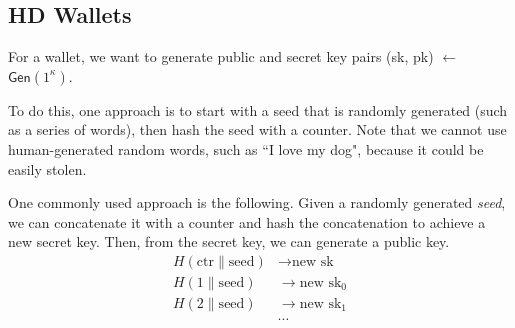 \subsection{HD Wallets}
For a wallet, we want to generate public and secret key pairs (sk, pk) $\longleftarrow$ $\mathsf{Gen}(1^\kappa)$.

To do this, one approach is to start with a seed that is randomly generated (such as a series of words), then hash the seed with a counter. Note that we cannot use human-generated random words, such as ``I love my dog", because it could be easily stolen.

One commonly used approach is the following. Given a randomly generated \textit{seed}, we can concatenate it with a counter and hash the concatenation to achieve a new secret key. Then, from the secret key, we can generate a public key.
\begin{align*}
H(\text{ctr}\|\text{seed})&\longrightarrow \text{new sk} \\
H(1\|\text{seed}) &\longrightarrow \text{new sk}_0  \\
H(2\|\text{seed}) &\longrightarrow \text{new sk}_1 \\
&\cdots
\end{align*}
